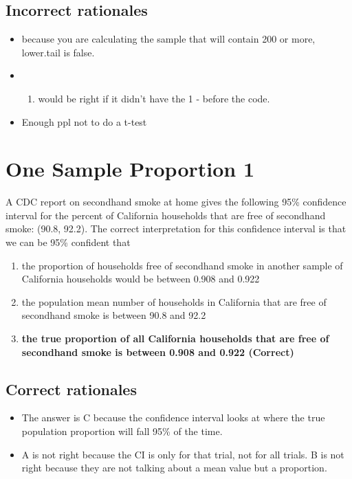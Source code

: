 \documentclass[letterpaper,9pt,twoside,printwatermark=false]{pinp}
\providecommand{\tightlist}{%
  \setlength{\itemsep}{0pt}\setlength{\parskip}{0pt}}
\begin{document}
\subsection{Incorrect rationales}\label{incorrect-rationales-5}

\begin{itemize}
\item
  because you are calculating the sample that will contain 200 or more,
  lower.tail is false.
\item
  \begin{enumerate}
  \def\labelenumi{\Alph{enumi})}
  \setcounter{enumi}{4}
  \tightlist
  \item
    would be right if it didn't have the 1 - before the code.
  \end{enumerate}
\item
  Enough ppl not to do a t-test
\end{itemize}

\section{One Sample Proportion 1}\label{one-sample-proportion-1}

A CDC report on secondhand smoke at home gives the following 95\%
confidence interval for the percent of California households that are
free of secondhand smoke: (90.8, 92.2). The correct interpretation for
this confidence interval is that we can be 95\% confident that

\begin{enumerate}
\def\labelenumi{\alph{enumi}.}
\tightlist
\item
  the proportion of households free of secondhand smoke in another
  sample of California households would be between 0.908 and 0.922
\item
  the population mean number of households in California that are free
  of secondhand smoke is between 90.8 and 92.2
\item
  \textbf{the true proportion of all California households that are free
  of secondhand smoke is between 0.908 and 0.922 (Correct)}
\end{enumerate}

\subsection{Correct rationales}\label{correct-rationales-6}

\begin{itemize}
\tightlist
\item
  The answer is C because the confidence interval looks at where the
  true population proportion will fall 95\% of the time.
\item
  A is not right because the CI is only for that trial, not for all
  trials. B is not right because they are not talking about a mean value
  but a proportion.
\end{itemize}
\end{document}
